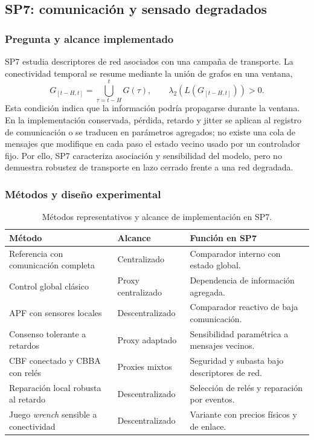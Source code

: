 \subsection{SP7: comunicación y sensado degradados}
\label{sec:resultados-sp7}

\subsubsection{Pregunta y alcance implementado}

SP7 estudia descriptores de red asociados con una campaña de transporte. La conectividad temporal se resume mediante la unión de grafos en una ventana,
\[
 G_{[t-H,t]}=\bigcup_{\tau=t-H}^{t}G(\tau), \qquad
 \lambda_2\!\left(L(G_{[t-H,t]})\right)>0.
\]
Esta condición indica que la información podría propagarse durante la ventana. En la implementación conservada, pérdida, retardo y jitter se aplican al registro de comunicación o se traducen en parámetros agregados; no existe una cola de mensajes que modifique en cada paso el estado vecino usado por un controlador fijo. Por ello, SP7 caracteriza asociación y sensibilidad del modelo, pero no demuestra robustez de transporte en lazo cerrado frente a una red degradada.



\subsubsection{Métodos y diseño experimental}

\begin{table}[H]
\centering
\scriptsize
\begin{tabularx}{\textwidth}{@{}p{}p{}X@{}}
\toprule
Método & Alcance & Función en SP7 \\
\midrule
Referencia con comunicación completa & Centralizado & Comparador interno con estado global. \\
Control global clásico & Proxy centralizado & Dependencia de información agregada. \\
APF con sensores locales & Descentralizado & Comparador reactivo de baja comunicación. \\
Consenso tolerante a retardos & Proxy adaptado & Sensibilidad paramétrica a mensajes vecinos. \\
CBF conectado y CBBA con relés & Proxies mixtos & Seguridad y subasta bajo descriptores de red. \\
Reparación local robusta al retardo & Descentralizado & Selección de relés y reparación por eventos. \\
Juego \emph{wrench} sensible a conectividad & Descentralizado & Variante con precios físicos y de enlace. \\
\bottomrule
\end{tabularx}
\caption{Métodos representativos y alcance de implementación en SP7.}
\label{tab:sp7-methods}
\end{table}

